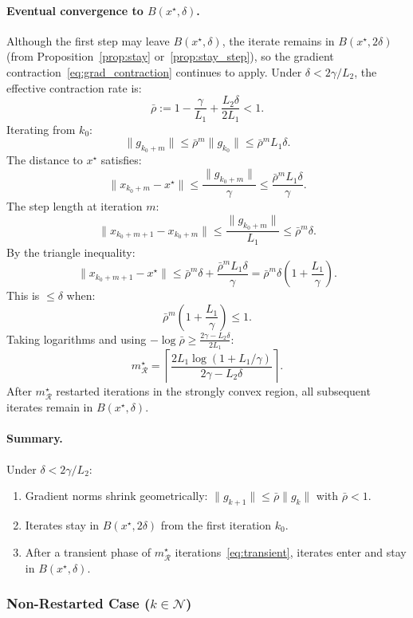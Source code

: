 \documentclass{article}
\begin{document}
\paragraph{Eventual convergence to $B(x^\star, \delta)$.} Although the first step may leave $B(x^\star, \delta)$, the iterate remains in $B(x^\star, 2\delta)$ (from Proposition~\ref{prop:stay} or~\ref{prop:stay_step}), so the gradient contraction~\eqref{eq:grad_contraction} continues to apply. Under $\delta < 2\gamma/L_2$, the effective contraction rate is:
\[
\bar{\rho} := 1 - \frac{\gamma}{L_1} + \frac{L_2\delta}{2L_1} < 1.
\]
Iterating from $k_0$:
\[
\|g_{k_0+m}\| \leq \bar{\rho}^m \|g_{k_0}\| \leq \bar{\rho}^m L_1\delta.
\]
The distance to $x^\star$ satisfies:
\[
\|x_{k_0+m} - x^\star\| \leq \frac{\|g_{k_0+m}\|}{\gamma} \leq \frac{\bar{\rho}^m L_1\delta}{\gamma}.
\]
The step length at iteration $m$:
\[
\|x_{k_0+m+1} - x_{k_0+m}\| \leq \frac{\|g_{k_0+m}\|}{L_1} \leq \bar{\rho}^m\delta.
\]
By the triangle inequality:
\[
\|x_{k_0+m+1} - x^\star\| \leq \bar{\rho}^m\delta + \frac{\bar{\rho}^m L_1\delta}{\gamma} = \bar{\rho}^m\delta\left(1 + \frac{L_1}{\gamma}\right).
\]
This is $\leq \delta$ when:
\[
\bar{\rho}^m\left(1 + \frac{L_1}{\gamma}\right) \leq 1.
\]
Taking logarithms and using $-\log\bar{\rho} \geq \frac{2\gamma - L_2\delta}{2L_1}$:
\begin{equation}
\label{eq:transient}
m^\star_{\mathcal{R}} = \left\lceil\frac{2L_1\log\left(1 + L_1/\gamma\right)}{2\gamma - L_2\delta}\right\rceil.
\end{equation}
After $m^\star_{\mathcal{R}}$ restarted iterations in the strongly convex region, all subsequent iterates remain in $B(x^\star, \delta)$.

\paragraph{Summary.} Under $\delta < 2\gamma/L_2$:
\begin{enumerate}
    \item Gradient norms shrink geometrically: $\|g_{k+1}\| \leq \bar{\rho}\|g_k\|$ with $\bar{\rho} < 1$.
    \item Iterates stay in $B(x^\star, 2\delta)$ from the first iteration $k_0$.
    \item After a transient phase of $m^\star_{\mathcal{R}}$ iterations~\eqref{eq:transient}, iterates enter and stay in $B(x^\star, \delta)$.
\end{enumerate}

\subsubsection{Non-Restarted Case ($k \in \mathcal{N}$)}
\end{document}

